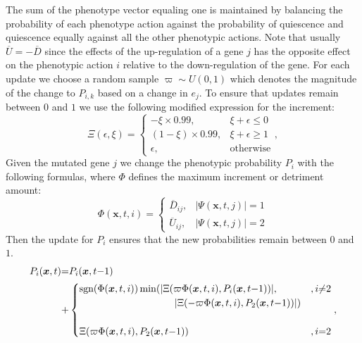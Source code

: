 \documentclass[\main/thesis.tex]{subfiles}
\begin{document}
The sum of the phenotype vector equaling one is maintained by balancing the probability of 
each phenotype action against the probability of quiescence and quiescence equally against all the other phenotypic actions. Note that usually $\overline{U}{=}{-}\overline{D}$ since the effects of the up-regulation of a gene $j$ has the opposite effect on the phenotypic action $i$ relative to the down-regulation of the gene. For each update we choose a random sample $\varpi {\sim} U(0, 1)$ which denotes the magnitude of the change to $P_{i, k}$ based on a change in $e_j$. To ensure that updates remain between $0$ and $1$ we use the following modified expression for the increment:
\begin{equation}
\Xi(\epsilon, \xi) {=} \begin{cases}
                          {-}\xi {\times} 0.99,
                           & \xi {+} \epsilon {\le} 0 \\
                          (1 {-} \xi) {\times} 0.99,
                           & \xi {+} \epsilon {\ge} 1 \\
                          \epsilon, & \text{otherwise}
                         \end{cases},
\label{eq:phenotypicActionBoundaryFunction}
\end{equation}
Given the mutated gene $j$ we change the phenotypic probability $P_i$ with the following formulas, where $\Phi$ defines the maximum increment or detriment amount:
\begin{equation}
\Phi(\boldsymbol{x}, t, i) =
\begin{cases}
  \overline{D}_{ij}, &|\Psi(\boldsymbol{x}, t, j)| = 1 \\
  \overline{U}_{ij}, &|\Psi(\boldsymbol{x}, t, j)| = 2
\end{cases}
\label{eq:phenotypeMutateEpsilon}
\end{equation}
Then the update for $P_i$ ensures that the new probabilities remain between $0$ and $1$. 
\begin{align}
P_i(\boldsymbol{x}, t) &{=} P_i(\boldsymbol{x}, t{-}1) \nonumber \\ &{+}
                           \begin{cases}
                             \text{sgn}(\Phi(\boldsymbol{x}, t, i))
                             \min(|\Xi(\varpi \Phi(\boldsymbol{x}, t, i),  
                                   P_i(\boldsymbol{x}, t{-}1))|,   
                               & , i {\ne} 2 \\
                             \hspace{3.4cm} |\Xi({-}\varpi \Phi(\boldsymbol{x}, t, i),  
                                             P_2(\boldsymbol{x}, t{-}1))|)\\
                             \\
                             \Xi(\varpi \Phi(\boldsymbol{x}, t, i), 
                                 P_2(\boldsymbol{x}, t{-}1))
                               & , i {=} 2
                            \end{cases},
\label{eq:phenotypeMutate}
\end{align}
\end{document}
